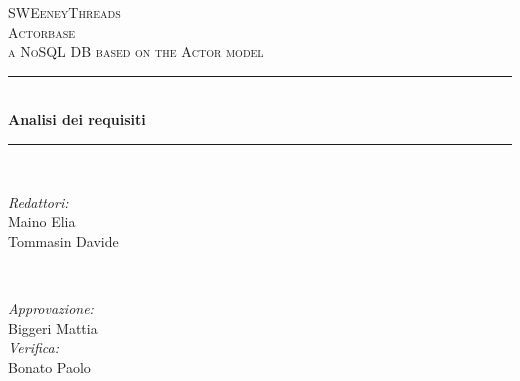 \documentclass[a4paper]{article}
\begin{document}
	
	\begin{titlepage}
		\newcommand{\HRule}{\rule{\linewidth}{0.5mm}} 
		\center  
		
		\textsc{\LARGE SWEeneyThreads}\\[1.5cm] 
		\textsc{\Large Actorbase}\\[0.5cm] 
		\textsc{\large a NoSQL DB based on the Actor model}\\[0.5cm]
		
		
		\HRule \\[0.4cm]
		{ \huge \bfseries Analisi dei requisiti}\\[0.4cm] 
		\HRule \\[1.5cm]
		
		\begin{minipage}{0.4\textwidth}
			\begin{flushleft} \large
				\emph{Redattori:}\\
				Maino Elia \\
				Tommasin Davide
			\end{flushleft}
		\end{minipage}
		~
		\begin{minipage}{0.4\textwidth}
			\begin{flushright} \large
				\emph{Approvazione:} \\
				Biggeri Mattia \\
				\emph{Verifica:} \\
				Bonato Paolo 
			\end{flushright}
		\end{minipage}
		

\end{titlepage}
\end{document}
